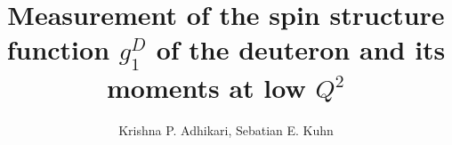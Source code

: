 \documentclass[12pt,epsfig]{report}
\begin{document}

\title{Measurement of the spin structure function $g^D_{1}$ of the deuteron and its moments at low $Q^2$}   
\author{Krishna P. Adhikari, Sebatian E. Kuhn}

\maketitle



\tableofcontents
\begin{comment} %
\listoffigures
\listoftables
\end{comment} %



%




\begin{comment} %







\end{comment} %



\begin{comment} %


\end{comment} %




\appendix
%
\end{document}
